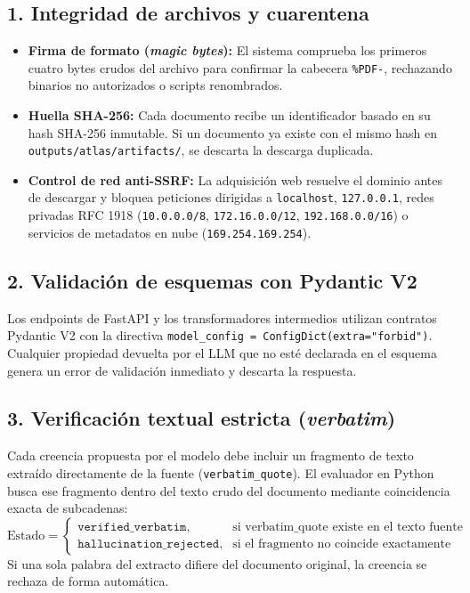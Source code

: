 \documentclass[11pt,a4paper]{article}
\begin{document}
\subsection{1. Integridad de archivos y cuarentena}
\begin{itemize}[leftmargin=*]
    \item \textbf{Firma de formato (\textit{magic bytes}):} El sistema comprueba los primeros cuatro bytes crudos del archivo para confirmar la cabecera \texttt{\%PDF-}, rechazando binarios no autorizados o scripts renombrados.
    \item \textbf{Huella SHA-256:} Cada documento recibe un identificador basado en su hash SHA-256 inmutable. Si un documento ya existe con el mismo hash en \texttt{outputs/atlas/artifacts/}, se descarta la descarga duplicada.
    \item \textbf{Control de red anti-SSRF:} La adquisición web resuelve el dominio antes de descargar y bloquea peticiones dirigidas a \texttt{localhost}, \texttt{127.0.0.1}, redes privadas RFC 1918 (\texttt{10.0.0.0/8}, \texttt{172.16.0.0/12}, \texttt{192.168.0.0/16}) o servicios de metadatos en nube (\texttt{169.254.169.254}).
\end{itemize}

\subsection{2. Validación de esquemas con Pydantic V2}
Los endpoints de FastAPI y los transformadores intermedios utilizan contratos Pydantic V2 con la directiva \texttt{model\_config = ConfigDict(extra="forbid")}. Cualquier propiedad devuelta por el LLM que no esté declarada en el esquema genera un error de validación inmediato y descarta la respuesta.

\subsection{3. Verificación textual estricta (\textit{verbatim})}
Cada creencia propuesta por el modelo debe incluir un fragmento de texto extraído directamente de la fuente (\texttt{verbatim\_quote}). El evaluador en Python busca ese fragmento dentro del texto crudo del documento mediante coincidencia exacta de subcadenas:
\begin{equation}
    \text{Estado} = \begin{cases}
        \texttt{verified\_verbatim}, & \text{si } \text{verbatim\_quote} \text{ existe en el texto fuente} \\
        \texttt{hallucination\_rejected}, & \text{si el fragmento no coincide exactamente}
    \end{cases}
\end{equation}
Si una sola palabra del extracto difiere del documento original, la creencia se rechaza de forma automática.
\end{document}
